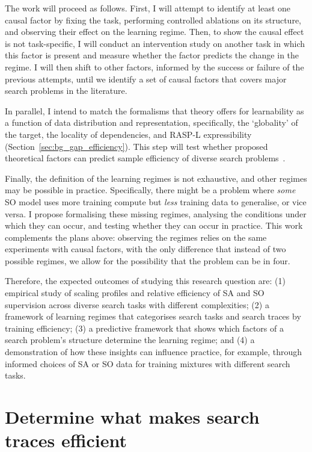 The work will proceed as follows.
First, I will attempt to identify at least one causal factor by fixing the task, performing controlled ablations on its structure, and observing their effect on the learning regime.
Then, to show the causal effect is not task-specific, I will conduct an intervention study on another task in which this factor is present and measure whether the factor predicts the change in the regime.
I will then shift to other factors, informed by the success or failure of the previous attempts, until we identify a set of causal factors that covers major search problems in the literature.

In parallel, I intend to match the formalisms that theory offers for learnability as a function of data distribution and representation, specifically, the `globality' of the target, the locality of dependencies, and RASP-L expressibility (Section~\ref{sec:bg_gap_efficiency}).
This step will test whether proposed theoretical factors can predict sample efficiency of diverse search problems~\citep{abbeHowFarCan2024,prystawskiWhyThinkStep2023,zhouWhatAlgorithmsCan2023}.

Finally, the definition of the learning regimes is not exhaustive, and other regimes may be possible in practice.
Specifically, there might be a problem where \textit{some} SO model uses more training compute but \textit{less} training data to generalise, or vice versa.
I propose formalising these missing regimes, analysing the conditions under which they can occur, and testing whether they can occur in practice.
This work complements the plans above: observing the regimes relies on the same experiments with causal factors, with the only difference that instead of two possible regimes, we allow for the possibility that the problem can be in four.

Therefore, the expected outcomes of studying this research question are: (1) empirical study of scaling profiles and relative efficiency of SA and SO supervision across diverse search tasks with different complexities; (2) a framework of learning regimes that categorises search tasks and search traces by training efficiency; (3) a predictive framework that shows which factors of a search problem's structure determine the learning regime; and (4) a demonstration of how these insights can influence practice, for example, through informed choices of SA or SO data for training mixtures with different search tasks.

\section{Determine what makes search traces efficient}
\label{sec:proposal_rq2}

